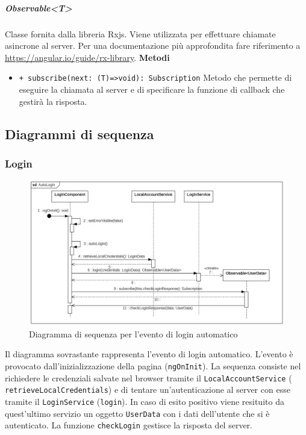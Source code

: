 \subparagraph{Observable<T>}
Classe fornita dalla libreria Rxjs. Viene utilizzata per effettuare chiamate asincrone al server. Per una documentazione più approfondita fare riferimento a \url{https://angular.io/guide/rx-library}. \newline
\textbf{Metodi}
\begin{itemize}
	\item \texttt{+ subscribe(next: (T)=>void): Subscription} \newline
	Metodo che permette di eseguire la chiamata al server e di specificare la funzione di callback che gestirà la risposta.
\end{itemize}

\subsection{Diagrammi di sequenza}
\subsubsection{Login}
\begin{figure}[H]
	\centering
	\includegraphics[width=18cm]{res/images/webapp-autologin-diagrammaSequenza.png}
	\caption{Diagramma di sequenza per l'evento di login automatico}
	\label{fig:DiagrammaSequenzaAutoLogin}
\end{figure}
Il diagramma sovrastante rappresenta l'evento di login automatico. L'evento è provocato dall'inizializzazione della pagina (\texttt{ngOnInit}). La sequenza consiste nel richiedere le credenziali salvate nel browser tramite il \texttt{LocalAccountService} ( \texttt{retrieveLocalCredentials}) e di tentare un'autenticazione al server con esse tramite il \texttt{LoginService} (\texttt{login}). In caso di esito positivo viene resituito da quest'ultimo servizio un oggetto \texttt{UserData} con i dati dell'utente che si è autenticato. La funzione \texttt{checkLogin} gestisce la risposta del server.
